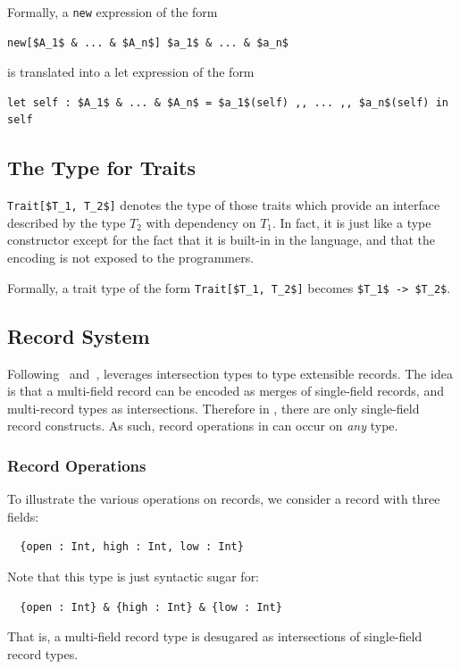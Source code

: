 Formally, a \lstinline{new} expression of the form
\begin{lstlisting}[mathescape=true]
  new[$A_1$ & ... & $A_n$] $a_1$ & ... & $a_n$
\end{lstlisting}
is translated into a let expression of the form
\begin{lstlisting}[mathescape=true]
  let self : $A_1$ & ... & $A_n$ = $a_1$(self) ,, ... ,, $a_n$(self) in self
\end{lstlisting}

\subsection{The Type for Traits}

\lstinline[mathescape=true]{Trait[$T_1, T_2$]} denotes the type of those traits
which provide an interface described by the type $T_2$ with dependency on $T_1$.
In fact, it is just like a type constructor except for the fact that it is
built-in in the language, and that the encoding is not exposed to the
programmers.

Formally, a trait type of the form \lstinline[mathescape=true]{Trait[$T_1, T_2$]} becomes \lstinline[mathescape=true]{$T_1$ -> $T_2$}.

\subsection{Record System}

Following~\citet{reynolds1997design} and~\citet{castagna1995calculus}, \name
leverages intersection types to type extensible records. The idea is that a
multi-field record can be encoded as merges of single-field records, and
multi-record types as intersections. Therefore in \name, there are only
single-field record constructs. As such, record operations in \name can occur on
\textit{any} type.

\subsubsection{Record Operations}

To illustrate the various operations on records, we consider a record with three
fields:
\begin{lstlisting}
  {open : Int, high : Int, low : Int}
\end{lstlisting}
Note that this type is just syntactic sugar for:
\begin{lstlisting}
  {open : Int} & {high : Int} & {low : Int}
\end{lstlisting}
That is, a multi-field record type is desugared as intersections of single-field
record types.

